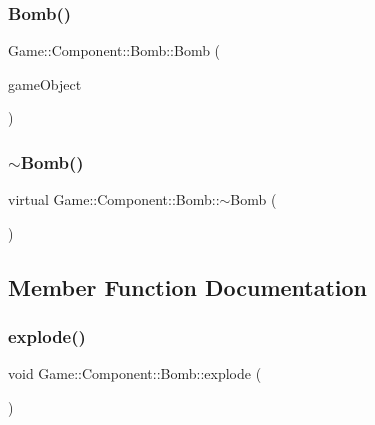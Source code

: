 \subsubsection{\texorpdfstring{Bomb()}{Bomb()}}
{\footnotesize\ttfamily Game\+::\+Component\+::\+Bomb\+::\+Bomb (\begin{DoxyParamCaption}\item[{\mbox{\hyperlink{class_beer_engine_1_1_game_object}{Beer\+Engine\+::\+Game\+Object}} $\ast$}]{game\+Object }\end{DoxyParamCaption})}

\mbox{\label{class_game_1_1_component_1_1_bomb_a08d967ddfb90d063b71270ce6d087c2f}} 
\subsubsection{\texorpdfstring{$\sim$\+Bomb()}{~Bomb()}}
{\footnotesize\ttfamily virtual Game\+::\+Component\+::\+Bomb\+::$\sim$\+Bomb (\begin{DoxyParamCaption}\item[{void}]{ }\end{DoxyParamCaption})\hspace{0.3cm}{\ttfamily [virtual]}}



\subsection{Member Function Documentation}
\mbox{\label{class_game_1_1_component_1_1_bomb_aac712a604337a08ce89f88782cae5df9}} 
\subsubsection{\texorpdfstring{explode()}{explode()}}
{\footnotesize\ttfamily void Game\+::\+Component\+::\+Bomb\+::explode (\begin{DoxyParamCaption}\item[{void}]{ }\end{DoxyParamCaption})}


